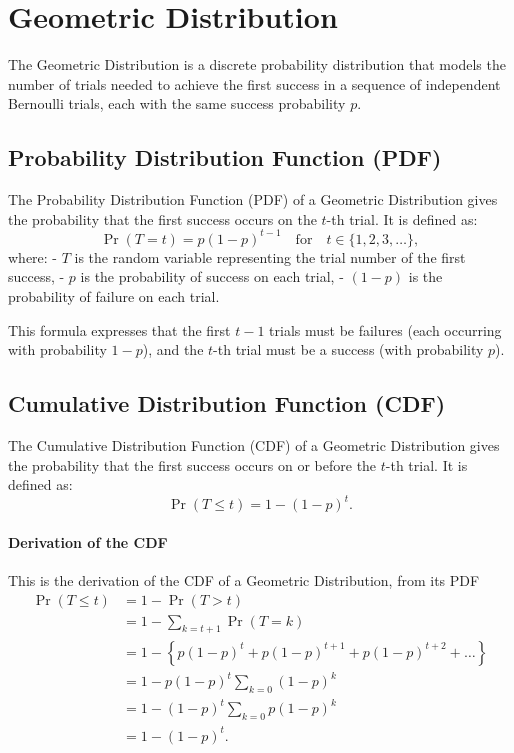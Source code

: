 \documentclass{masterthesis}
\begin{document}
\section*{Geometric Distribution}\label{section:geometric_distribution}

The Geometric Distribution is a discrete probability distribution that models the number of trials needed to achieve the first success in a sequence of independent Bernoulli trials, each with the same success probability \( p \).

\subsection*{Probability Distribution Function (PDF)}

The Probability Distribution Function (PDF) of a Geometric Distribution gives the probability that the first success occurs on the \( t \)-th trial. It is defined as:
\begin{equation}
    \Pr(T = t) = p (1 - p)^{t-1} \quad \text{for} \quad t \in \{1, 2, 3, \ldots \},
\end{equation}
where:
- \( T \) is the random variable representing the trial number of the first success,
- \( p \) is the probability of success on each trial,
- \( (1 - p) \) is the probability of failure on each trial.

This formula expresses that the first \( t-1 \) trials must be failures (each occurring with probability \( 1 - p \)), and the \( t \)-th trial must be a success (with probability \( p \)).

\subsection*{Cumulative Distribution Function (CDF)}\label{subsection:geometric_cdf}

The Cumulative Distribution Function (CDF) of a Geometric Distribution gives the probability that the first success occurs on or before the \( t \)-th trial. It is defined as:
\begin{equation}
    \Pr(T \leq t) = 1 - (1 - p)^t.
\end{equation}

\paragraph*{Derivation of the CDF}

This is the derivation of the CDF of a Geometric Distribution, from its PDF
\begin{align}
    \Pr(T \leq t) &= 1 - \Pr(T > t) \\
    &= 1 - \sum_{k=t+1} \Pr(T = k) \\
    &= 1 - \left\{p (1 - p)^t + p (1 - p)^{t+1} + p (1 - p)^{t+2} + \ldots\right\} \\
    &= 1 - p (1 - p)^t \sum_{k=0} (1 - p)^k \\
    &= 1 - (1 - p)^t \sum_{k=0} p (1 - p)^k \\
    &= 1 - (1 - p)^t.
\end{align}
\end{document}
